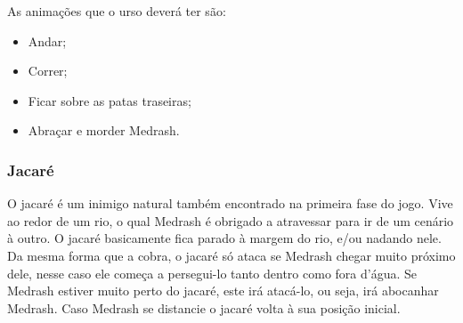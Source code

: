 \begin{itemize}
As animações que o urso deverá ter são:
\begin{itemize}
\item Andar;
\item Correr;
\item Ficar sobre as patas traseiras;
\item Abraçar e morder Medrash.
\end{itemize}
\end{itemize}

\subsubsection{Jacaré}
O jacaré é um inimigo natural também encontrado na primeira fase do jogo.
 Vive ao redor de um rio, o qual Medrash é obrigado a atravessar para ir de
 um cenário à outro. O jacaré basicamente fica parado à margem do rio, e/ou
 nadando nele. Da mesma forma que a cobra, o jacaré só ataca se Medrash
 chegar muito próximo dele, nesse caso ele começa a persegui-lo tanto
 dentro como fora d'água. Se Medrash estiver muito perto do jacaré, este
 irá atacá-lo, ou seja, irá abocanhar Medrash. Caso Medrash se distancie o
 jacaré volta à sua posição inicial.
